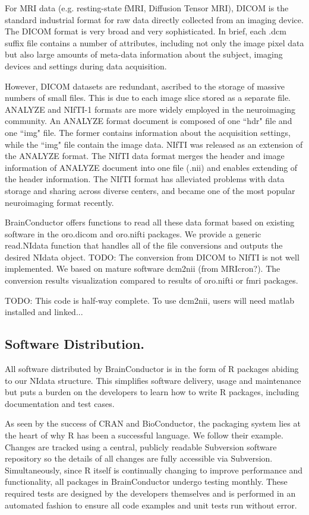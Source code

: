 \documentclass{nature}
\begin{document}
For MRI data (e.g. resting-state fMRI, Diffusion Tensor MRI),
DICOM is the standard industrial
format for raw data directly collected from an imaging device. The DICOM format
is very broad and very sophisticated. In brief, each .dcm suffix file contains a
number of attributes, including not only the image pixel data but also large
amounts of meta-data information about the subject, imaging devices and settings
during data acquisition.  

However, DICOM datasets are redundant, ascribed to the storage of massive
numbers of small files. This is due to each image slice stored as a separate
file. ANALYZE and NIfTI-1 formats are more widely employed in the neuroimaging
community. An ANALYZE format document is composed of one ``hdr" file and one
``img" file. The former contains information about the acquisition settings,
while the ``img" file contain the image data. NIfTI was released as an extension
of the ANALYZE format. The NIfTI data format merges the header and image
information of ANALYZE document into one file (.nii) and enables extending of
the header information. The NIfTI format has alleviated problems with data
storage and sharing across diverse centers, and became one of the most popular
neuroimaging format recently. 

BrainConductor offers functions to read all these data format
based on existing software in the oro.dicom and oro.nifti packages. We
provide a generic read.NIdata function that handles all of the file 
conversions and outputs the desired NIdata object.
{\color{red} TODO: The conversion from DICOM to NIfTI is not well implemented.
We based on mature
software dcm2nii (from MRIcron?). The conversion results visualization compared
to results of
oro.nifti or fmri packages.}

{\color{red}TODO: This code is half-way complete. To use dcm2nii, users will need
matlab installed and linked...}

\subsection{Software Distribution.}

All software distributed by BrainConductor is in the form of R packages abiding
to our NIdata structure. This 
simplifies software delivery, usage and maintenance but puts a burden on the
developers
to learn how to write R packages, including documentation and test cases.

As seen by the success of CRAN and BioConductor, the packaging system lies
at the heart of why R has been a successful language. We follow their example.
Changes are tracked using a central, publicly readable Subversion software
repository
so the details of all changes are fully accessible via Subversion.
Simultaneously, since
R itself is continually changing to improve performance and functionality, all
packages
in BrainConductor undergo testing monthly. These required tests are designed by
the 
developers themselves and is performed in an automated fashion to ensure
all code examples and unit tests run without error.
\end{document}
